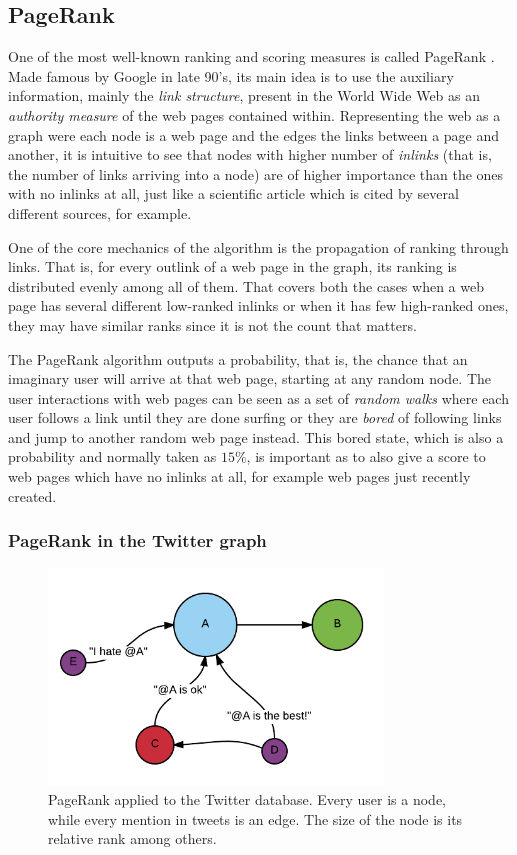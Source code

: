 \subsection{PageRank}

One of the most well-known ranking and scoring measures is called PageRank \cite{pr}. Made famous by Google in late 90's, its main idea is to use the auxiliary information, mainly the \emph{link structure}, present in the World Wide Web as an \emph{authority measure} of the web pages contained within. Representing the web as a graph were each node is a web page and the edges the links between a page and another, it is intuitive to see that nodes with higher number of \emph{inlinks} (that is, the number of links arriving into a node) are of higher importance than the ones with no inlinks at all, just like a scientific article which is cited by several different sources, for example.

One of the core mechanics of the algorithm is the propagation of ranking through links. That is, for every outlink of a web page in the graph, its ranking is distributed evenly among all of them. That covers both the cases when a web page has several different low-ranked inlinks or when it has few high-ranked ones,  they may have similar ranks since it is not the count that matters.

The PageRank algorithm outputs a probability, that is, the chance that an imaginary user will arrive at that web page, starting at any random node. The user interactions with web pages can be seen as a set of \emph{random walks} where each user follows a link until they are done surfing or they are \emph{bored} of following links and jump to another random web page instead. This bored state, which is also a probability  and normally taken as $15\%$, is important as to also give a score to web pages which have no inlinks at all,  for example web pages just recently created.

\subsubsection{PageRank in the Twitter graph}

\begin{figure}[t]
\centering
\includegraphics[width=3.5in,natwidth=534,natheight=345]{images/PageRank.png}
\caption{PageRank applied to the Twitter database. Every user is a node, while every mention in tweets is an edge. The size of the node is its relative rank among others.}
\label{fig:pagerank}
\end{figure}

